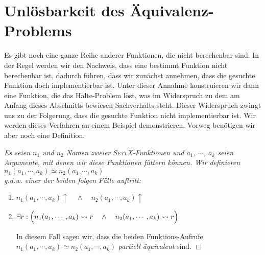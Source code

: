 \section{Unl\"osbarkeit des Äquivalenz-Problems}
Es gibt noch eine ganze Reihe anderer Funktionen, die nicht berechenbar sind.  In der
Regel werden wir den Nachweis, dass eine bestimmt Funktion nicht berechenbar ist, dadurch f\"uhren, dass
wir zun\"achst annehmen, dass die gesuchte Funktion doch implementierbar ist.  Unter dieser Annahme
konstruieren wir dann eine Funktion, die das Halte-Problem l\"ost, was im Widerspruch zu dem am Anfang dieses Abschnitts
bewiesen Sachverhalts steht.
Dieser Widerspruch zwingt uns zu der Folgerung, dass die gesuchte Funktion nicht implementierbar ist.
Wir werden dieses Verfahren an einem Beispiel demonstrieren. Vorweg ben\"otigen wir aber
noch eine Definition.

\begin{Definition}[$\simeq$] 
{\em 
Es seien $n_1$ und $n_2$ Namen zweier \textsc{SetlX}-Funktionen und
  $a_1$, $\cdots$, $a_k$ seien Argumente, mit denen wir diese Funktionen f\"uttern k\"onnen. Wir definieren \\[0.1cm]
\hspace*{1.3cm} $n_1(a_1,\cdots,a_k) \simeq n_2(a_1,\cdots,a_k)$ \\[0.1cm]
g.d.w. einer der beiden folgen F\"alle auftritt:
\begin{enumerate}
\item $n_1(a_1,\cdots,a_k)\uparrow \quad\wedge\quad n_2(a_1,\cdots,a_k)\uparrow$
\item $\exists r: \Bigl(n_1(a_1,\cdots,a_k) \leadsto r \quad\wedge\quad n_2(a_1,\cdots,a_k) \leadsto r\Bigr)$

      In diesem Fall sagen wir, dass die beiden Funktions-Aufrufe 
      $n_1(a_1,\cdots,a_k) \simeq n_2(a_1,\cdots,a_k)$ \emph{partiell \"aquivalent} sind.
      \hspace*{\fill} $\Box$
\end{enumerate}}
\end{Definition}


